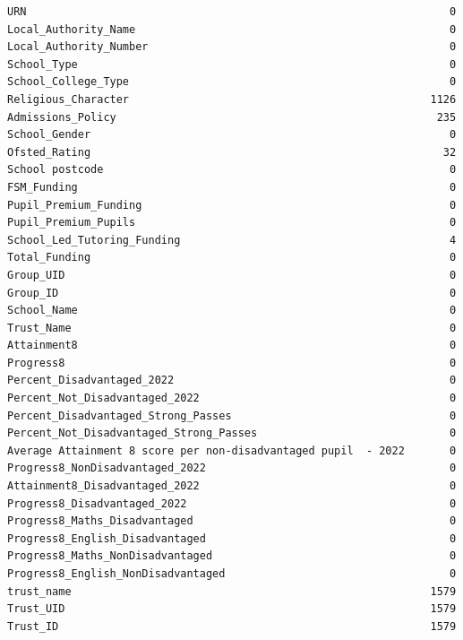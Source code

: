\documentclass[
  letterpaper,
  DIV=11,
  numbers=noendperiod]{scrartcl}
\begin{document}
\begin{verbatim}
URN                                                                  0
Local_Authority_Name                                                 0
Local_Authority_Number                                               0
School_Type                                                          0
School_College_Type                                                  0
Religious_Character                                               1126
Admissions_Policy                                                  235
School_Gender                                                        0
Ofsted_Rating                                                       32
School postcode                                                      0
FSM_Funding                                                          0
Pupil_Premium_Funding                                                0
Pupil_Premium_Pupils                                                 0
School_Led_Tutoring_Funding                                          4
Total_Funding                                                        0
Group_UID                                                            0
Group_ID                                                             0
School_Name                                                          0
Trust_Name                                                           0
Attainment8                                                          0
Progress8                                                            0
Percent_Disadvantaged_2022                                           0
Percent_Not_Disadvantaged_2022                                       0
Percent_Disadvantaged_Strong_Passes                                  0
Percent_Not_Disadvantaged_Strong_Passes                              0
Average Attainment 8 score per non-disadvantaged pupil  - 2022       0
Progress8_NonDisadvantaged_2022                                      0
Attainment8_Disadvantaged_2022                                       0
Progress8_Disadvantaged_2022                                         0
Progress8_Maths_Disadvantaged                                        0
Progress8_English_Disadvantaged                                      0
Progress8_Maths_NonDisadvantaged                                     0
Progress8_English_NonDisadvantaged                                   0
trust_name                                                        1579
Trust_UID                                                         1579
Trust_ID                                                          1579

\end{verbatim}
\end{document}
